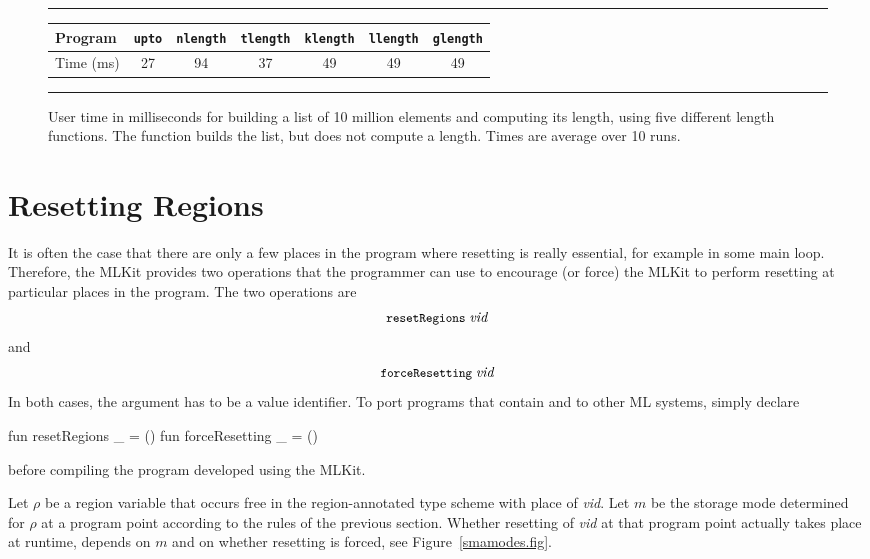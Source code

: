 \documentclass[12pt]{book}
\begin{document}
\begin{figure}
\hrule
\medskip
\begin{center}
\def\arraystretch{1.4}
\begin{tabular}{l|cccccc}
Program      & {\tt upto} & {\tt nlength} & {\tt tlength} & {\tt klength} & {\tt llength} & {\tt glength} \\ \hline
Time (ms)    & 27         & 94            & 37            & 49            & 49            & 49
\end{tabular}
\end{center}
\caption{User time in milliseconds for building a list of 10 million elements and
  computing its length, using five different length functions. The function
   builds the list, but does not compute a length. Times are average
  over 10 runs.}
\label{length.timing.fig}
\medskip
\hrule
\end{figure}

\section{Resetting Regions}

It is often the case that there are only a few places in the program where
resetting is really essential, for example in some main loop.  Therefore, the
MLKit provides two operations that the programmer can use to encourage (or
force) the MLKit to perform resetting at particular places in the program. The
two operations are
%
%
%
$$\mbox{\small\ttfamily resetRegions}\; {\it vid}$$
and
%
%
%
$$\mbox{\small\ttfamily forceResetting}\; {\it vid}$$ In both cases, the argument has to be a value
identifier.  To port programs that contain  and
 to other ML systems, simply declare
\begin{smlcode}
  fun resetRegions _ = ()
  fun forceResetting _ = ()
\end{smlcode}
before compiling the program developed using the MLKit.

Let $\rho$ be a region variable that occurs free in the region-annotated type
scheme with place of {\it vid}.  Let $m$ be the storage mode determined for
$\rho$ at a program point according to the rules of the previous section.
Whether resetting of {\it vid\/} at that program point actually takes place at
runtime, depends on $m$ and on whether resetting is forced, see
Figure~\ref{smamodes.fig}.
\end{document}
